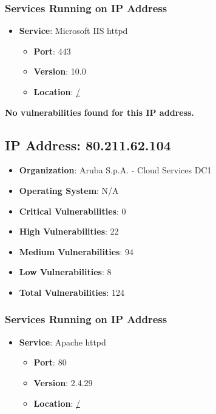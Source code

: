 \documentclass{article}
\begin{document}
\subsubsection*{Services Running on IP Address}

\begin{itemize}
    
        \item \textbf{Service}: Microsoft IIS httpd
        \begin{itemize}
            \item \textbf{Port}: 443
            \item \textbf{Version}:  10.0 
            \item \textbf{Location}: \href{ / }{ / }
        \end{itemize}
    
\end{itemize}


\textbf{No vulnerabilities found for this IP address.}




\clearpage



\subsection{IP Address: 80.211.62.104}

\begin{itemize}
    \item \textbf{Organization}: Aruba S.p.A. - Cloud Services DC1
    \item \textbf{Operating System}:  N/A 
    \item \textbf{Critical Vulnerabilities}: 0
    \item \textbf{High Vulnerabilities}: 22
    \item \textbf{Medium Vulnerabilities}: 94
    \item \textbf{Low Vulnerabilities}: 8
    \item \textbf{Total Vulnerabilities}: 124
\end{itemize}

\subsubsection*{Services Running on IP Address}

\begin{itemize}
    
        \item \textbf{Service}: Apache httpd
        \begin{itemize}
            \item \textbf{Port}: 80
            \item \textbf{Version}:  2.4.29 
            \item \textbf{Location}: \href{ / }{ / }
        \end{itemize}
    
\end{itemize}
\end{document}

